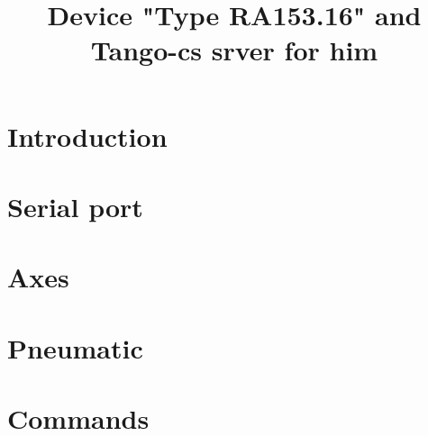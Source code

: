 \documentclass[prl, aps, showpacs, preprintnumbers, amsmath, amssymb, 
superscriptaddress]{revtex4-1}
\begin{document}
\title{Device "Type RA153.16" and Tango-cs srver for him}


\maketitle

\section{Introduction}
\section{Serial port}
\section{Axes}
\section{Pneumatic}
\section{Commands}
\end{document}
